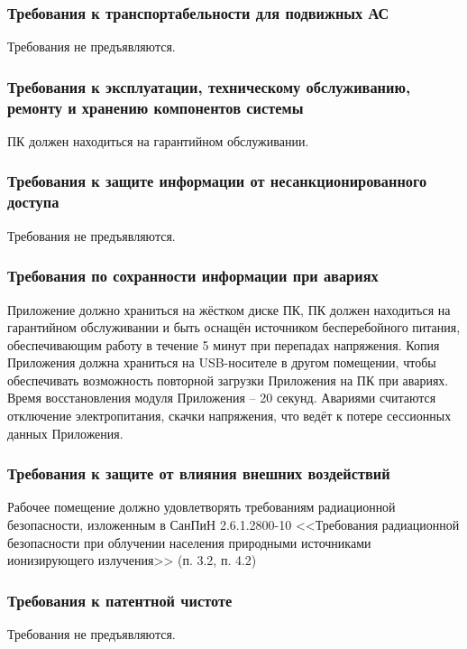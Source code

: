 \documentclass[12pt,a4paper]{article}
\begin{document}
\subsubsection{Требования к транспортабельности для подвижных АС}
Требования не предъявляются.

\subsubsection{Требования к эксплуатации, техническому обслуживанию, ремонту и хранению компонентов системы}
ПК должен находиться на гарантийном обслуживании.

\subsubsection{Требования к защите информации от несанкционированного доступа}
Требования не предъявляются.

\subsubsection{Требования по сохранности информации при авариях}\label{trouble}
Приложение должно храниться на жёстком диске ПК, ПК должен находиться на гарантийном обслуживании и быть
оснащён источником бесперебойного питания, обеспечивающим работу в течение 5 минут при перепадах напряжения. \medskip \newline
Копия Приложения должна храниться на USB-носителе в другом помещении, чтобы обеспечивать возможность повторной загрузки Приложения 
на ПК при авариях. Время восстановления модуля Приложения -- 20 секунд. \medskip \newline
Авариями считаются отключение электропитания, скачки напряжения, что ведёт к потере сессионных данных Приложения.

\subsubsection{Требования к защите от влияния внешних воздействий}
Рабочее помещение должно удовлетворять требованиям радиационной безопасности, изложенным в СанПиН 2.6.1.2800-10 
<<Требования радиационной  безопасности при облучении населения природными источниками ионизирующего излучения>> 
(п. 3.2, п. 4.2)

\subsubsection{Требования к патентной чистоте}
Требования не предъявляются.
\end{document}
